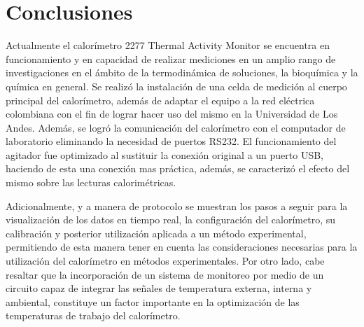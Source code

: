 
%




\chapter{Conclusiones}
Actualmente el calorímetro 2277 Thermal Activity Monitor se encuentra en funcionamiento y en capacidad de
realizar mediciones en un amplio rango de investigaciones en el ámbito de la termodinámica de soluciones, la bioqu\'imica y la qu\'imica en general. Se realiz\'o la instalaci\'on de una celda de medici\'on al cuerpo principal del calor\'imetro, adem\'as de adaptar el equipo a la red eléctrica colombiana con el fin de lograr
hacer uso del mismo en la Universidad de Los Andes. Además, se logró la comunicaci\'on del calor\'imetro con el computador de laboratorio eliminando la necesidad de puertos RS232. El funcionamiento del agitador fue optimizado al sustituir la conexión original a un puerto USB, haciendo de esta una conexión mas práctica, adem\'as, se caracteriz\'o el efecto del mismo sobre las lecturas calorim\'etricas. 

Adicionalmente, y a manera de protocolo se muestran los pasos a seguir para la visualización de los datos en tiempo real, la configuración del calor\'imetro, su calibración y posterior utilización aplicada a un método experimental, permitiendo de esta manera tener en cuenta las consideraciones necesarias para la utilización del calorímetro en métodos experimentales. Por otro lado, cabe resaltar que la incorporación de un sistema de monitoreo por medio de un circuito capaz de integrar las señales de temperatura externa, interna y ambiental, constituye un factor importante en la optimización de las temperaturas de trabajo del calor\'imetro. 


